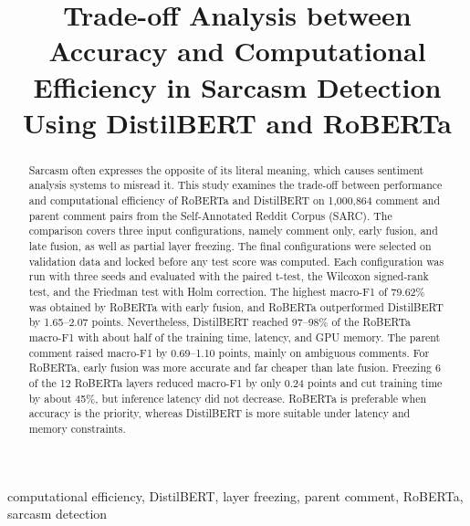 \documentclass[conference]{IEEEtran}
\begin{document}
\title{Trade-off Analysis between Accuracy and Computational Efficiency in Sarcasm Detection Using DistilBERT and RoBERTa}

\author{
\and
{}
}


\maketitle

\begin{abstract}
Sarcasm often expresses the opposite of its literal meaning, which causes sentiment analysis systems to misread it. This study examines the trade-off between performance and computational efficiency of RoBERTa and DistilBERT on 1,000,864 comment and parent comment pairs from the Self-Annotated Reddit Corpus (SARC). The comparison covers three input configurations, namely comment only, early fusion, and late fusion, as well as partial layer freezing. The final configurations were selected on validation data and locked before any test score was computed. Each configuration was run with three seeds and evaluated with the paired t-test, the Wilcoxon signed-rank test, and the Friedman test with Holm correction. The highest macro-F1 of 79.62\% was obtained by RoBERTa with early fusion, and RoBERTa outperformed DistilBERT by 1.65--2.07 points. Nevertheless, DistilBERT reached 97--98\% of the RoBERTa macro-F1 with about half of the training time, latency, and GPU memory. The parent comment raised macro-F1 by 0.69--1.10 points, mainly on ambiguous comments. For RoBERTa, early fusion was more accurate and far cheaper than late fusion. Freezing 6 of the 12 RoBERTa layers reduced macro-F1 by only 0.24 points and cut training time by about 45\%, but inference latency did not decrease. RoBERTa is preferable when accuracy is the priority, whereas DistilBERT is more suitable under latency and memory constraints.
\end{abstract}

\begin{IEEEkeywords}
computational efficiency, DistilBERT, layer freezing, parent comment, RoBERTa, sarcasm detection
\end{IEEEkeywords}
\end{document}
